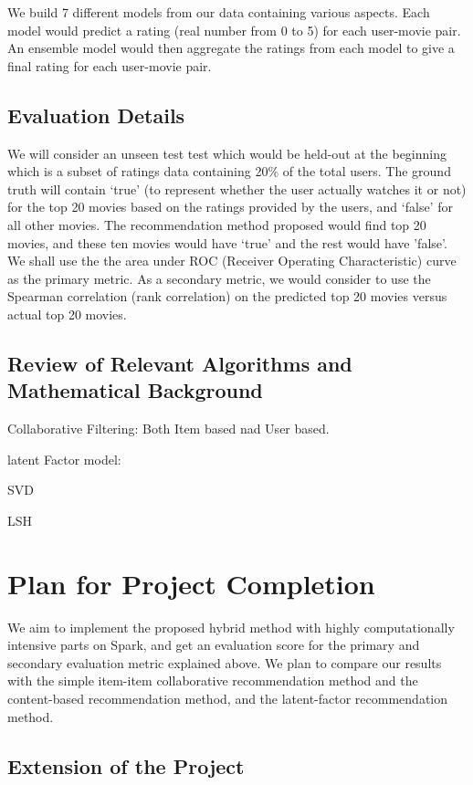 \documentclass{article}
\begin{document}
We build 7 different models from our data containing various aspects. Each model would predict a rating (real number from 0 to 5) for each user-movie pair. An ensemble model would then aggregate the ratings from each model to give a final rating for each user-movie pair.


\subsection{Evaluation Details}
We will consider an unseen test test which would be held-out at the beginning which is a subset of ratings data containing 20\% of the total users. The ground truth will contain ‘true’ (to represent whether the user actually watches it or not) for the top 20 movies based on the ratings provided by the users, and ‘false’ for all other movies. The recommendation method proposed would find top 20 movies, and these ten movies would have ‘true’ and the rest would have ’false’. We shall use the the area under ROC (Receiver Operating Characteristic) curve as the primary metric. As a secondary metric, we would consider to use the Spearman correlation (rank correlation) on the predicted top 20 movies versus actual top 20 movies.

\subsection{Review of Relevant Algorithms and Mathematical Background}
Collaborative Filtering: Both Item based nad User based.

latent Factor model:

SVD

LSH



\section{Plan for Project Completion}
We aim to implement the proposed hybrid method with highly computationally intensive parts on Spark, and get an evaluation score for the primary and secondary evaluation metric explained above. We plan to compare our results with the simple item-item collaborative recommendation method and the content-based recommendation method, and the latent-factor recommendation method.

\subsection{Extension of the Project}
\end{document}
